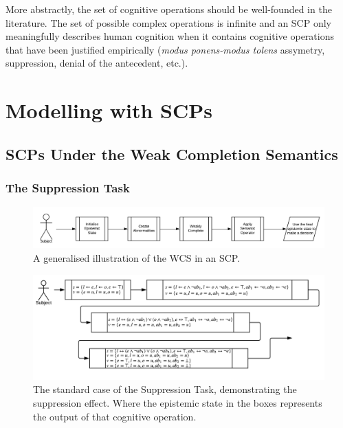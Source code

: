 \documentclass{article}
\begin{document}
More abstractly, the set of cognitive operations should be well-founded in the literature. The set of possible complex operations is infinite and an SCP only meaningfully describes human cognition when it contains cognitive operations that have been justified empirically (\textit{modus ponens-modus tolens} assymetry, suppression, denial of the antecedent, etc.). 

\section{Modelling with SCPs}
\subsection{SCPs Under the Weak Completion Semantics}

\subsubsection{The Suppression Task}
\begin{figure}
\begin{center}
 \centering \includegraphics[scale=0.65]{suppressionSCP_overview}
\caption{A generalised illustration of the WCS in an SCP. }
\label {fig:supoverview}
\end{center}
\end{figure}

\begin{figure}
\begin{center}
 \centering \includegraphics[scale=0.75]{suppressionSCP_normal}
\caption{The standard case of the Suppression Task, demonstrating the suppression effect. Where the epistemic state in the boxes represents the output of that cognitive operation.}
\label {fig:supnormal}
\end{center}
\end{figure}
\end{document}
